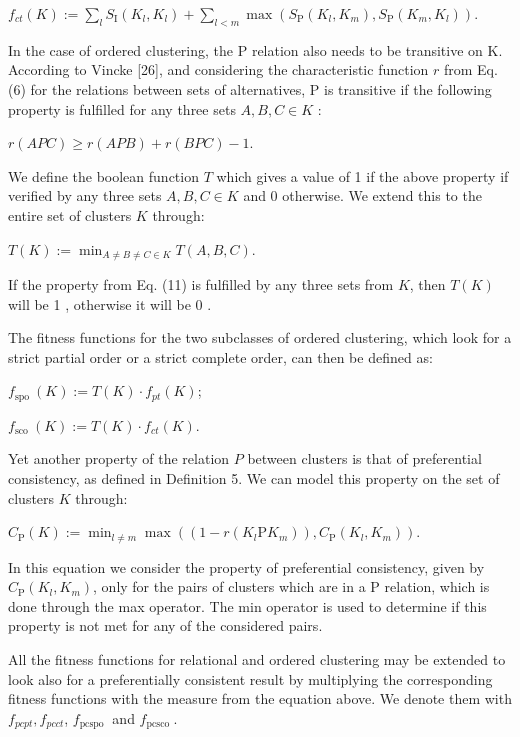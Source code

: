 \documentclass[10pt]{article}
\begin{document}
$f_{c t}(K):=\sum_{l} S_{\mathrm{I}}\left(K_{l}, K_{l}\right)+\sum_{l<m} \max \left(S_{\mathrm{P}}\left(K_{l}, K_{m}\right), S_{\mathrm{P}}\left(K_{m}, K_{l}\right)\right)$.

In the case of ordered clustering, the $\mathrm{P}$ relation also needs to be transitive on K. According to Vincke [26], and considering the characteristic function $r$ from Eq. (6) for the relations between sets of alternatives, $\mathrm{P}$ is transitive if the following property is fulfilled for any three sets $A, B, C \in K$ :

$r(A P C) \geqslant r(A P B)+r(B P C)-1$.

We define the boolean function $T$ which gives a value of 1 if the above property if verified by any three sets $A, B, C \in K$ and 0 otherwise. We extend this to the entire set of clusters $K$ through:

$T(K):=\min _{A \neq B \neq C \in K} T(A, B, C)$.

If the property from Eq. (11) is fulfilled by any three sets from $K$, then $T(K)$ will be 1 , otherwise it will be 0 .

The fitness functions for the two subclasses of ordered clustering, which look for a strict partial order or a strict complete order, can then be defined as:

$f_{\text {spo }}(K):=T(K) \cdot f_{p t}(K)$;

$f_{\text {sco }}(K):=T(K) \cdot f_{c t}(K)$.

Yet another property of the relation $P$ between clusters is that of preferential consistency, as defined in Definition 5. We can model this property on the set of clusters $K$ through:

$C_{\mathrm{P}}(K):=\min _{l \neq m} \max \left(\left(1-r\left(K_{l} \mathrm{P} K_{m}\right)\right), C_{\mathrm{P}}\left(K_{l}, K_{m}\right)\right)$.

In this equation we consider the property of preferential consistency, given by $C_{\mathrm{P}}\left(K_{l}, K_{m}\right)$, only for the pairs of clusters which are in
a $\mathrm{P}$ relation, which is done through the max operator. The min operator is used to determine if this property is not met for any of the considered pairs.

All the fitness functions for relational and ordered clustering may be extended to look also for a preferentially consistent result by multiplying the corresponding fitness functions with the measure from the equation above. We denote them with $f_{p c p t}, f_{p c c t}$, $f_{\text {pcspo }}$ and $f_{\text {pcsco }}$.
\end{document}
